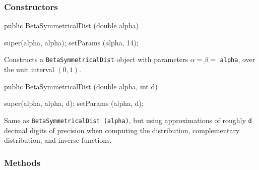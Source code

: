 \subsubsection* {Constructors}

\begin{code}

   public BetaSymmetricalDist (double alpha)\begin{hide} {
      super(alpha, alpha);
      setParams (alpha, 14);
   }\end{hide}
\end{code}
  \begin{tabb}  Constructs a \texttt{BetaSymmetricalDist} object with parameters
   $\alpha = \beta =$ \texttt{alpha}, over the unit interval $(0,1)$.
  \end{tabb}
\begin{code}

   public BetaSymmetricalDist (double alpha, int d)\begin{hide} {
      super(alpha, alpha, d);
      setParams (alpha, d);
   }\end{hide}
\end{code}
\begin{tabb}
   Same as \texttt{BetaSymmetricalDist (alpha)}, but using approximations of
   roughly \texttt{d} decimal digits of precision when computing the
   distribution, complementary distribution, and inverse functions.
\end{tabb}

\subsubsection* {Methods}

